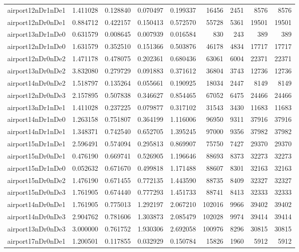 \documentclass[../../../thesis.tex]{subfiles}
\begin{document}
\begin{longtable}{|l|r|r|r|r|r|r|r|r|}
airport12nDr1nDe1 & 1.411028 & 0.128840 & 0.070497 & 0.199337 & 16456 & 2451 & 8576 & 8576 \\
airport12nDr0nDe1 & 0.884712 & 0.422157 & 0.150413 & 0.572570 & 55728 & 5361 & 19501 & 19501 \\
airport13nDr1nDe0 & 0.631579 & 0.008645 & 0.007939 & 0.016584 & 830 & 243 & 389 & 389 \\
airport12nDr1nDe0 & 1.631579 & 0.352510 & 0.151366 & 0.503876 & 46178 & 4834 & 17717 & 17717 \\
airport12nDr0nDe2 & 1.471178 & 0.478075 & 0.202361 & 0.680436 & 63061 & 6004 & 22371 & 22371 \\
airport13nDr0nDe2 & 3.832080 & 0.279729 & 0.091883 & 0.371612 & 36804 & 3743 & 12736 & 12736 \\
airport14nDr0nDe2 & 1.518797 & 0.135264 & 0.055661 & 0.190925 & 18034 & 2447 & 8149 & 8149 \\
airport12nDr0nDe3 & 2.157895 & 0.507838 & 0.346627 & 0.854465 & 67052 & 6475 & 24466 & 24466 \\
airport13nDr1nDe1 & 1.411028 & 0.237225 & 0.079877 & 0.317102 & 31543 & 3430 & 11683 & 11683 \\
airport14nDr1nDe0 & 1.263158 & 0.751807 & 0.364199 & 1.116006 & 96950 & 9311 & 37916 & 37916 \\
airport14nDr1nDe1 & 1.348371 & 0.742540 & 0.652705 & 1.395245 & 97000 & 9356 & 37982 & 37982 \\
airport15nDr1nDe1 & 2.596491 & 0.574094 & 0.295813 & 0.869907 & 75750 & 7427 & 29370 & 29370 \\
airport15nDr0nDe1 & 0.476190 & 0.669741 & 0.526905 & 1.196646 & 88693 & 8373 & 32273 & 32273 \\
airport15nDr1nDe0 & 0.052632 & 0.671670 & 0.499818 & 1.171488 & 88607 & 8301 & 32163 & 32163 \\
airport15nDr0nDe2 & 1.476190 & 0.671455 & 0.772135 & 1.443590 & 88735 & 8409 & 32327 & 32327 \\
airport15nDr0nDe3 & 1.761905 & 0.674440 & 0.777293 & 1.451733 & 88741 & 8413 & 32333 & 32333 \\
airport14nDr0nDe1 & 1.761905 & 0.775013 & 1.292197 & 2.067210 & 102016 & 9966 & 39402 & 39402 \\
airport14nDr0nDe3 & 2.904762 & 0.781606 & 1.303873 & 2.085479 & 102028 & 9974 & 39414 & 39414 \\
airport13nDr0nDe3 & 3.000000 & 0.761752 & 1.930306 & 2.692058 & 100976 & 8296 & 30815 & 30815 \\
airport17nDr0nDe1 & 1.200501 & 0.117855 & 0.032929 & 0.150784 & 15826 & 1960 & 5912 & 5912 \\

\end{longtable}
\end{document}
